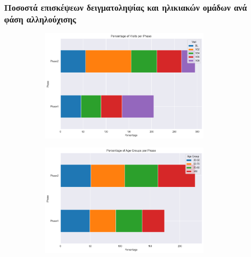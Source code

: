 \documentclass[12pt]{report}
\begin{document}
            \subsubsection*{Ποσοστά επισκέψεων δειγματοληψίας και ηλικιακών ομάδων ανά φάση αλληλούχισης}
                \vspace{-0.5cm}
                \begin{figure}[H]
                    \centering
                    \begin{subfigure}[b]{0.9\textwidth}
                        \centering
                        \includegraphics[width=0.9\textwidth]{Chapter-2-Section-2.1/ppmi-bars-pd-ctrl-visits-per-phase.png}
                    \end{subfigure}
                    \vspace{0.3cm}
                    \begin{subfigure}[b]{0.9\textwidth}
                        \centering
                        \includegraphics[width=0.9\textwidth]{Chapter-2-Section-2.1/ppmi-bars-pd-ctrl-age_groups-per-phase.png}
                    \end{subfigure}
                    \label{fig:app_pcts_visits_age_groups_per_phase}
                \end{figure}
\end{document}

